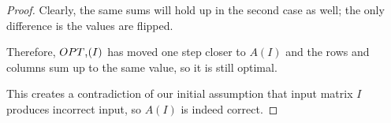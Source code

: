 \documentclass{article}
\begin{document}
\begin{proof}
	Clearly, the same sums will hold up in the second case as well; the only difference is the values are flipped.
	
	Therefore, $OPT\textsc{\char13}(I)$ has moved one step closer to $A(I)$ and the rows and columns sum up to the same value, so it is still optimal.
	
	This creates a contradiction of our initial assumption that input matrix $I$ produces incorrect input, so $A(I)$ is
	indeed correct.
	\end{proof}
\end{document}
